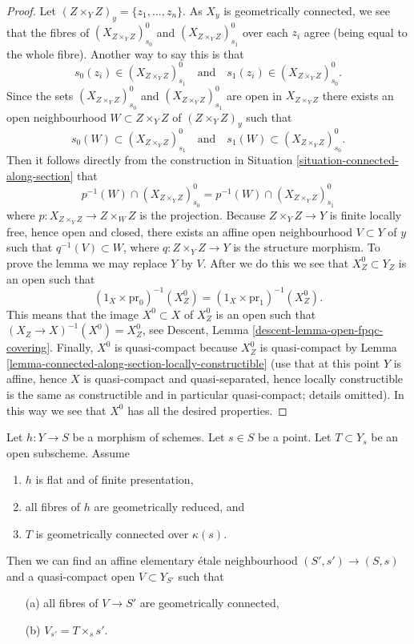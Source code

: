 \begin{proof}
\medskip\noindent
Let $(Z \times_Y Z)_y = \{z_1, \ldots, z_n\}$.
As $X_y$ is geometrically connected, we see that the fibres of
$(X_{Z \times_Y Z})_{s_0}^0$ and $(X_{Z \times_Y Z})_{s_1}^0$
over each $z_i$ agree (being equal to the whole fibre). Another
way to say this is that
$$
s_0(z_i) \in (X_{Z \times_Y Z})_{s_1}^0
\quad\text{and}\quad
s_1(z_i) \in (X_{Z \times_Y Z})_{s_0}^0.
$$
Since the sets $(X_{Z \times_Y Z})_{s_0}^0$ and $(X_{Z \times_Y Z})_{s_1}^0$
are open in $X_{Z \times_Y Z}$ there exists an open neighbourhood
$W \subset Z \times_Y Z$ of $(Z \times_Y Z)_y$ such that
$$
s_0(W) \subset (X_{Z \times_Y Z})_{s_1}^0
\quad\text{and}\quad
s_1(W) \subset (X_{Z \times_Y Z})_{s_0}^0.
$$
Then it follows directly from the construction in
Situation \ref{situation-connected-along-section}
that
$$
p^{-1}(W) \cap (X_{Z \times_Y Z})_{s_0}^0
=
p^{-1}(W) \cap (X_{Z \times_Y Z})_{s_1}^0
$$
where $p : X_{Z \times_Y Z} \to Z \times_W Z$ is the projection.
Because $Z \times_Y Z \to Y$ is finite locally free, hence open and closed,
there exists an affine open neighbourhood $V \subset Y$ of $y$ such that
$q^{-1}(V) \subset W$, where $q : Z \times_Y Z \to Y$ is the
structure morphism. To prove the lemma we may replace $Y$ by $V$.
After we do this we see that $X_Z^0 \subset Y_Z$ is an open such that
$$
(1_X \times \text{pr}_0)^{-1}(X_Z^0) =
(1_X \times \text{pr}_1)^{-1}(X_Z^0).
$$
This means that the image $X^0 \subset X$ of $X_Z^0$ is an open such
that $(X_Z \to X)^{-1}(X^0) = X_Z^0$, see
Descent, Lemma \ref{descent-lemma-open-fpqc-covering}.
Finally, $X^0$ is quasi-compact because $X_Z^0$ is quasi-compact
by Lemma \ref{lemma-connected-along-section-locally-constructible}
(use that at this point $Y$ is affine, hence $X$ is quasi-compact and
quasi-separated, hence locally constructible is the same as constructible
and in particular quasi-compact; details omitted).
In this way we see that $X^0$ has all the desired properties.
\end{proof}

\begin{lemma}
\label{lemma-fibre-geometrically-connected-reduced}
Let $h : Y \to S$ be a morphism of schemes.
Let $s \in S$ be a point.
Let $T \subset Y_s$ be an open subscheme.
Assume
\begin{enumerate}
\item $h$ is flat and of finite presentation,
\item all fibres of $h$ are geometrically reduced, and
\item $T$ is geometrically connected over $\kappa(s)$.
\end{enumerate}
Then we can find an affine elementary \'etale neighbourhood
$(S', s') \to (S, s)$
and a quasi-compact open $V \subset Y_{S'}$ such that
\begin{enumerate}
\item[(a)] all fibres of $V \to S'$ are geometrically connected,
\item[(b)] $V_{s'} = T \times_s s'$.
\end{enumerate}
\end{lemma}

